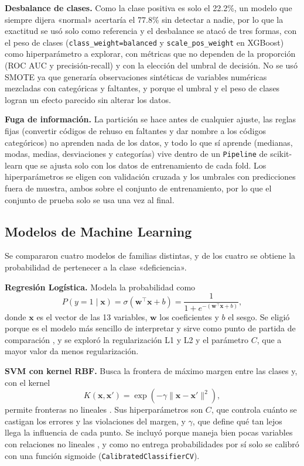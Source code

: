 \documentclass[conference]{IEEEtran}
\begin{document}
\textbf{Desbalance de clases.} Como la clase positiva es solo el 22.2\%, un modelo que siempre dijera «normal» acertaría el 77.8\% sin detectar a nadie, por lo que la exactitud se usó solo como referencia y el desbalance se atacó de tres formas, con el peso de clases (\texttt{class\_weight=balanced} y \texttt{scale\_pos\_weight} en XGBoost) como hiperparámetro a explorar, con métricas que no dependen de la proporción (ROC AUC y precisión-recall) y con la elección del umbral de decisión. No se usó SMOTE ya que generaría observaciones sintéticas de variables numéricas mezcladas con categóricas y faltantes, y porque el umbral y el peso de clases logran un efecto parecido sin alterar los datos.

\textbf{Fuga de información.} La partición se hace antes de cualquier ajuste, las reglas fijas (convertir códigos de rehuso en faltantes y dar nombre a los códigos categóricos) no aprenden nada de los datos, y todo lo que sí aprende (medianas, modas, medias, desviaciones y categorías) vive dentro de un \texttt{Pipeline} de scikit-learn \cite{pedregosa2011, sklearn_compose} que se ajusta solo con los datos de entrenamiento de cada fold. Los hiperparámetros se eligen con validación cruzada y los umbrales con predicciones fuera de muestra, ambos sobre el conjunto de entrenamiento, por lo que el conjunto de prueba solo se usa una vez al final.

\subsection{Modelos de Machine Learning}

Se compararon cuatro modelos de familias distintas, y de los cuatro se obtiene la probabilidad de pertenecer a la clase «deficiencia».

\textbf{Regresión Logística.} Modela la probabilidad como
\begin{equation}
P(y=1\mid \mathbf{x})=\sigma(\mathbf{w}^{\top}\mathbf{x}+b)=\frac{1}{1+e^{-(\mathbf{w}^{\top}\mathbf{x}+b)}},
\end{equation}
donde $\mathbf{x}$ es el vector de las 13 variables, $\mathbf{w}$ los coeficientes y $b$ el sesgo. Se eligió porque es el modelo más sencillo de interpretar y sirve como punto de partida de comparación \cite{garay_f1}, y se exploró la regularización L1 y L2 y el parámetro $C$, que a mayor valor da menos regularización.

\textbf{SVM con kernel RBF.} Busca la frontera de máximo margen entre las clases y, con el kernel
\begin{equation}
K(\mathbf{x},\mathbf{x}')=\exp\left(-\gamma\lVert \mathbf{x}-\mathbf{x}'\rVert^2\right),
\end{equation}
permite fronteras no lineales \cite{cortes1995, sklearn_svm}. Sus hiperparámetros son $C$, que controla cuánto se castigan los errores y las violaciones del margen, y $\gamma$, que define qué tan lejos llega la influencia de cada punto. Se incluyó porque maneja bien pocas variables con relaciones no lineales \cite{garay_f2}, y como no entrega probabilidades por sí solo se calibró con una función sigmoide (\texttt{CalibratedClassifierCV}).
\end{document}

